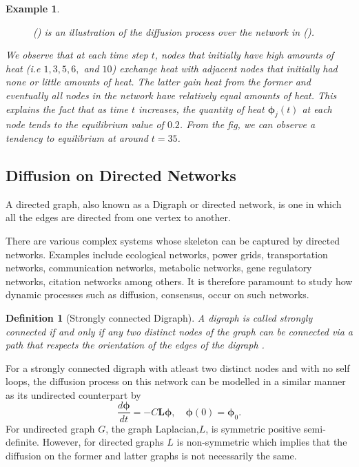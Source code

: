 \documentclass[10pt,a4paper]{article}
\newtheorem{defn}{Definition}
\newtheorem{exa}{Example}
\begin{document}
\begin{exa}
\begin{figure}[!h]
\begin{subfigure}[b]{0.45\textwidth}
    	 			\caption{}
    	 			\label{difn-plot}
    	 		\end{subfigure}
    	 		\caption{() is an illustration of the diffusion process over the network in (). }
    	 		\label{graph-plot}
    	 	\end{figure}
     	  We observe that at each time step $t$, nodes that initially have high amounts of heat (i.e $1,3,5,6,$ and $10$) exchange heat with adjacent nodes that initially had none or little amounts of heat. The latter gain heat from the former and eventually all nodes in the network have relatively equal amounts of heat. This explains the fact that as time $t$ increases, the quantity of heat $\boldsymbol{\phi}_j(t)$ at each node tends to the equilibrium value of $0.2$.  From the fig, we can observe a tendency to equilibrium at around $t=35$. 
    	 \end{exa}
        
         
        \subsection{Diffusion on Directed Networks}
        A directed graph, also known as a Digraph or directed network, is one in which all the edges are directed from one vertex to another. 
        
        There are various complex systems whose skeleton can be captured by directed networks. Examples include ecological  networks, power grids, transportation networks, communication networks, metabolic networks, gene regulatory networks, citation networks among others. It is therefore paramount to study how dynamic processes such as diffusion, consensus, occur on such networks.
        
        \begin{defn}[Strongly connected Digraph]
        	A digraph is called strongly connected if and only if any two distinct nodes of the graph can be connected via a path that respects the orientation of the edges of the digraph \citep{saber2003agreement}.
        \end{defn}        
        For a strongly connected digraph with atleast two distinct nodes and with no self loops, the diffusion process on this network can be modelled in a similar manner as its undirected counterpart by 
        \begin{equation}
        \frac{d\boldsymbol{\phi}}{dt} = -C\mathbf{L}\boldsymbol{\phi}, \quad \boldsymbol{\phi}(0) = \boldsymbol{\phi}_0.
        \end{equation}
        For undirected graph $G$, the graph Laplacian,$L$, is symmetric positive semi-definite. However, for directed graphs $L$ is non-symmetric which implies that the diffusion on the former and latter graphs is not necessarily the same.
        
\end{document}

